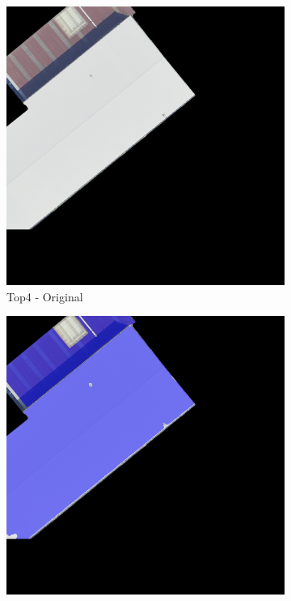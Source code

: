 \begin{figure}[H]
\begin{subfigure}{0.32\textwidth}
    \includegraphics[width=\textwidth]{02-main//figures/ch4/kfold_ensembles/segformer_tu-regnety_080.ra3_in1k/best_cases/best_2_iou0.985_24931117_tile_18_5_f475a0_original.png}
    \caption{Top4 - Original}
\end{subfigure}
\hfill
\begin{subfigure}{0.32\textwidth}
    \includegraphics[width=\textwidth]{02-main//figures/ch4/kfold_ensembles/segformer_tu-regnety_080.ra3_in1k/best_cases/best_2_iou0.985_24931117_tile_18_5_f475a0_overlay_gt.png}

\end{subfigure}
\end{figure}
